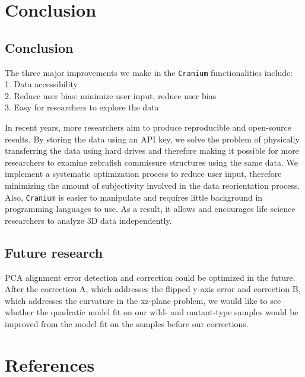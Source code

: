 \documentclass[10pt,letterpaper]{article}
\begin{document}
\hypertarget{conclusion}{%
\section{Conclusion}\label{conclusion}}

\hypertarget{conclusion-1}{%
\subsection{Conclusion}\label{conclusion-1}}

The three major improvements we make in the \texttt{Cranium}
functionalities include:\\
1. Data accessibility\\
2. Reduce user bias: minimize user input, reduce user bias\\
3. Easy for researchers to explore the data

In recent years, more researchers aim to produce reproducible and
open-source results. By storing the data using an API key, we solve the
problem of physically transferring the data using hard drives and
therefore making it possible for more researchers to examine zebrafish
commissure structures using the same data. We implement a systematic
optimization process to reduce user input, therefore minimizing the
amount of subjectivity involved in the data reorientation process. Also,
\texttt{Cranium} is easier to manipulate and requires little background
in programming languages to use. As a result, it allows and encourages
life science researchers to analyze 3D data independently.

\hypertarget{future-research}{%
\subsection{Future research}\label{future-research}}

PCA alignment error detection and correction could be optimized in the
future. After the correction A, which addresses the flipped y-axis error
and correction B, which addresses the curvature in the xz-plane problem,
we would like to see whether the quadratic model fit on our wild- and
mutant-type samples would be improved from the model fit on the samples
before our corrections.

\hypertarget{references}{%
\section*{References}\label{references}}
\end{document}
